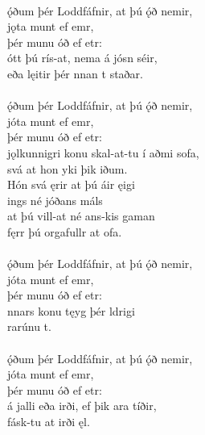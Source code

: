  \\

\bva {}ǫ́ðum þér Loddfáfnir, \hld at þú ǫ́ð nemir, \\%
\ind {}jǫta munt ef emr, \\%
\ind þér munu óð ef etr: \\%
ótt þú rís-at, \hld nema á jósn séir, \\%
\ind eða lęitir þér nnan t staðar.\\%

 \\

\bva {}ǫ́ðum þér Loddfáfnir, \hld at þú ǫ́ð nemir, \\%
\ind {}jóta munt ef emr, \\%
\ind þér munu óð ef etr: \\%
jǫlkunnigri konu \hld skal-at-tu í aðmi sofa, \\%
\ind svá at hon yki þik iðum. \\%
Hón svá ęrir \hld at þú áir ęigi \\%
\ind {}ings né jóðans máls \\%
at þú vill-at \hld né ans-kis gaman \\%
\ind fęrr þú orgafullr at ofa.\\%

 \\

\bva {}ǫ́ðum þér Loddfáfnir, \hld at þú ǫ́ð nemir, \\%
\ind {}jóta munt ef emr, \\%
\ind þér munu óð ef etr: \\%
nnars konu \hld tęyg þér ldrigi \\%
\ind {}rarúnu t.\\%

 \\

\bva {}ǫ́ðum þér Loddfáfnir, \hld at þú ǫ́ð nemir, \\%
\ind {}jóta munt ef emr, \\%
\ind þér munu óð ef etr: \\%
á jalli eða irði, \hld ef þik ara tíðir, \\%
\ind fásk-tu at irði ęl.\\%

